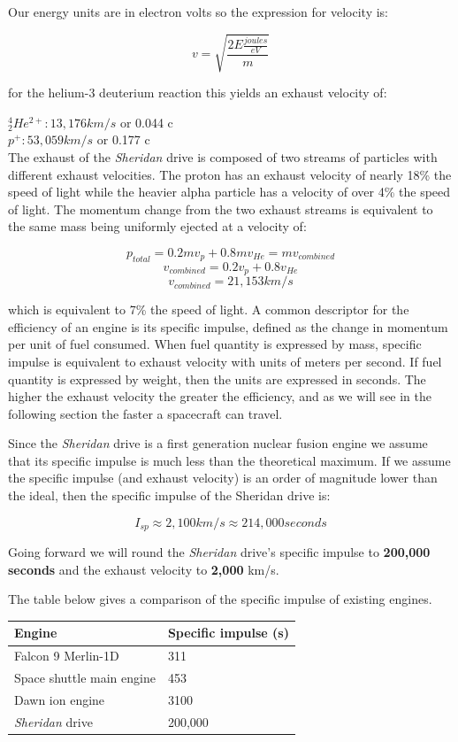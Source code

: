 \documentclass[12pt]{article} %
\begin{document}
Our energy units are in electron volts so the expression for velocity is:

$$v = \sqrt{\frac{2 E \frac{joules}{eV}}{m}}$$

for the helium-3 deuterium reaction this yields an exhaust velocity of:

$^4_2He^{2+}: 13,176 km/s$ or 0.044 c\\
$p^{+}: 53,059 km/s$ or 0.177 c\\

The exhaust of the \textit{Sheridan} drive is composed of two streams of particles with different exhaust velocities. The proton has an exhaust velocity of nearly 18\% the speed of light while the heavier alpha particle has a velocity of over 4\% the speed of light. The momentum change from the two exhaust streams is equivalent to the same mass being uniformly ejected at a velocity of:

$$p_{total} = 0.2mv_{p} + 0.8mv_{He} = mv_{combined}$$
$$v_{combined} = 0.2v_{p} + 0.8v_{He}$$
$$v_{combined} =  21,153km/s$$

which is equivalent to 7\% the speed of light. A common descriptor for the efficiency of an engine is its specific impulse, defined as the change in momentum per unit of fuel consumed.  When fuel quantity is expressed by mass, specific impulse is equivalent to exhaust velocity with units of meters per second. If fuel quantity is expressed by weight, then the units are expressed in seconds. The higher the exhaust velocity the greater the efficiency, and as we will see in the following section the faster a spacecraft can travel.

Since the \textit{Sheridan} drive is a first generation nuclear fusion engine we assume that its specific impulse is much less than the theoretical maximum. If we assume the specific impulse (and exhaust velocity) is an order of magnitude lower than the ideal, then the specific impulse of the Sheridan drive is:

$$I_{sp} \approx 2,100 km/s \approx 214,000 seconds$$

Going forward we will round the \textit{Sheridan} drive's specific impulse to \textbf{200,000 seconds} and the exhaust velocity to \textbf{2,000} km/s.

The table below gives a comparison of the specific impulse of existing engines.

\begin{center}
\begin{tabular}{|m{5 cm}| m{5 cm}|} \hline
\textbf{Engine} & \textbf{Specific impulse (s)}\\ \hline
Falcon 9 Merlin-1D &  311 \\ \hline
Space shuttle main engine &  453 \\ \hline
Dawn ion engine   &  3100\\ \hline
\textit{Sheridan} drive & 200,000\\ \hline
\end{tabular}
\end{center}
\end{document}
